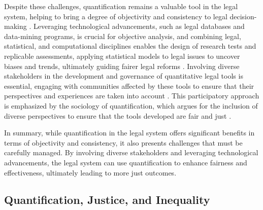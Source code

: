 Despite these challenges, quantification remains a valuable tool in the legal system, helping to bring a degree of objectivity and consistency to legal decision-making \cite{quantification_value}. Leveraging technological advancements, such as legal databases and data-mining programs, is crucial for objective analysis, and combining legal, statistical, and computational disciplines enables the design of research tests and replicable assessments, applying statistical models to legal issues to uncover biases and trends, ultimately guiding fairer legal reforms \cite{nunes2018,massuanganhe2016,maia2019}. Involving diverse stakeholders in the development and governance of quantitative legal tools is essential, engaging with communities affected by these tools to ensure that their perspectives and experiences are taken into account \cite{10.1007/s11186-021-09453-1,10.5040/9781350220645}. This participatory approach is emphasized by the sociology of quantification, which argues for the inclusion of diverse perspectives to ensure that the tools developed are fair and just \cite{10.1590/dados.2022.65.3.267,10.1057/s41599-020-0396-5}.

In summary, while quantification in the legal system offers significant benefits in terms of objectivity and consistency, it also presents challenges that must be carefully managed. By involving diverse stakeholders and leveraging technological advancements, the legal system can use quantification to enhance fairness and effectiveness, ultimately leading to more just outcomes.

\subsection{Quantification, Justice, and Inequality}


